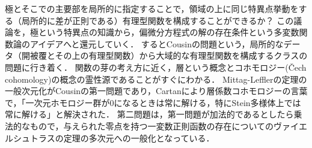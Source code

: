 \documentclass[uplatex, dvipdfmx]{jsreport}
\begin{document}
\begin{tcolorbox}[colframe=ForestGreen, colback=ForestGreen!10!white,breakable,colbacktitle=ForestGreen!40!white,coltitle=black,fonttitle=\bfseries\sffamily,
title=]
    極とそこでの主要部を局所的に指定することで，領域の上に同じ特異点挙動をする（局所的に差が正則である）有理型関数を構成することができるか？
    この議論を，極という特異点の知識から，偏微分方程式の解の存在条件という多変数関数論のアイデアへと還元していく．
    するとCousinの問題という，局所的なデータ（開被覆とその上の有理型関数）から大域的な有理型関数を構成するクラスの問題に行き着く．
    関数の芽の考え方に近く，層という概念とコホモロジー(Čech cohomology)の概念の霊性源であることがすぐにわかる．
    Mittag-Lefflerの定理の一般次元化がCousinの第一問題であり，Cartanにより層係数コホモロジーの言葉で，「一次元ホモロジー群が$0$になるときは常に解ける，特にStein多様体上では常に解ける」と解決された．
    第二問題は，第一問題が加法的であるとしたら乗法的なもので，与えられた零点を持つ一変数正則函数の存在についてのヴァイエルシュトラスの定理の多次元への一般化となっている．
\end{tcolorbox}
\end{document}
